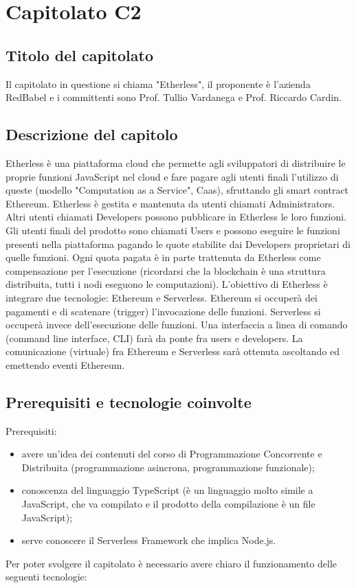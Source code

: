 \section{Capitolato C2}
\subsection{Titolo del capitolato}
Il capitolato in questione si chiama "Etherless", il proponente \`e l'azienda RedBabel e i committenti sono Prof. Tullio Vardanega e Prof. Riccardo Cardin.

\subsection{Descrizione del capitolo}
Etherless \`e una piattaforma cloud che permette agli sviluppatori di distribuire le proprie funzioni JavaScript nel cloud e fare pagare agli utenti finali l'utilizzo di queste (modello "Computation as a Service", Caas), sfruttando gli smart contract Ethereum. 
Etherless \`e gestita e mantenuta da utenti chiamati Administrators. Altri utenti chiamati Developers possono pubblicare in Etherless le loro funzioni. Gli utenti finali del prodotto sono chiamati Users e possono eseguire le funzioni presenti nella piattaforma pagando le quote stabilite dai Developers proprietari di quelle funzioni. Ogni quota pagata \`e in parte trattenuta da Etherless come compensazione per l'esecuzione (ricordarsi che la blockchain \`e una struttura distribuita, tutti i nodi eseguono le computazioni).
L'obiettivo di Etherless \`e integrare due tecnologie: Ethereum e Serverless. Ethereum si occuper\`a dei pagamenti e di scatenare (trigger) l'invocazione delle funzioni. Serverless si occuper\`a invece dell'esecuzione delle funzioni. Una interfaccia a linea di comando (command line interface, CLI) far\`a da ponte fra users e developers. La comunicazione (virtuale) fra Ethereum e Serverless sar\`a ottenuta ascoltando ed emettendo eventi Ethereum.

\subsection{Prerequisiti e tecnologie coinvolte}
Prerequisiti:
\begin{itemize}
\item avere un'idea dei contenuti del corso di Programmazione Concorrente e Distribuita (programmazione asincrona, programmazione funzionale);
\item conoscenza del linguaggio TypeScript (\`e un linguaggio molto simile a JavaScript, che va compilato e il prodotto della compilazione \`e un file JavaScript);
\item serve conoscere il Serverless Framework che implica Node.js.
\end{itemize}
Per poter svolgere il capitolato \`e necessario avere chiaro il funzionamento delle seguenti tecnologie:

